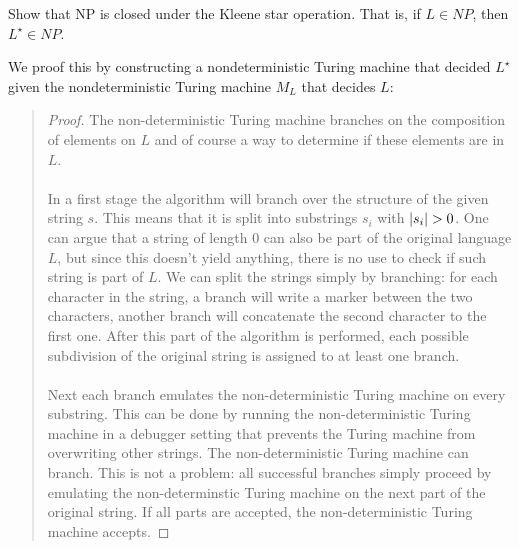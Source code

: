 \documentclass{article}
\begin{document}
\begin{exercise}
Show that NP is closed under the Kleene star operation. That is, if $L\in NP$, then $L^{\star}\in NP$.
\begin{answer}
We proof this by constructing a nondeterministic Turing machine that decided $L^{\star}$ given the nondeterministic Turing machine $M_L$ that decides $L$:
\begin{quote}\begin{proof}
The non-deterministic Turing machine branches on the composition of elements on $L$ and of course a way to determine if these elements are in $L$.
\paragraph{}
In a first stage the algorithm will branch over the structure of the given string $s$. This means that it is split into substrings $s_i$ with $\abs{s_i}>0$. One can argue that a string of length $0$ can also be part of the original language $L$, but since this doesn't yield anything, there is no use to check if such string is part of $L$. We can split the strings simply by branching: for each character in the string, a branch will write a marker between the two characters, another branch will concatenate the second character to the first one. After this part of the algorithm is performed, each possible subdivision of the original string is assigned to at least one branch.
\paragraph{}
Next each branch emulates the non-deterministic Turing machine on every substring. This can be done by running the non-deterministic Turing machine in a debugger setting that prevents the Turing machine from overwriting other strings. The non-deterministic Turing machine can branch. This is not a problem: all successful branches simply proceed by emulating the non-determinstic Turing machine on the next part of the original string. If all parts are accepted, the non-deterministic Turing machine accepts.

\end{proof}
\end{quote}
\end{answer}
\end{exercise}
\end{document}
